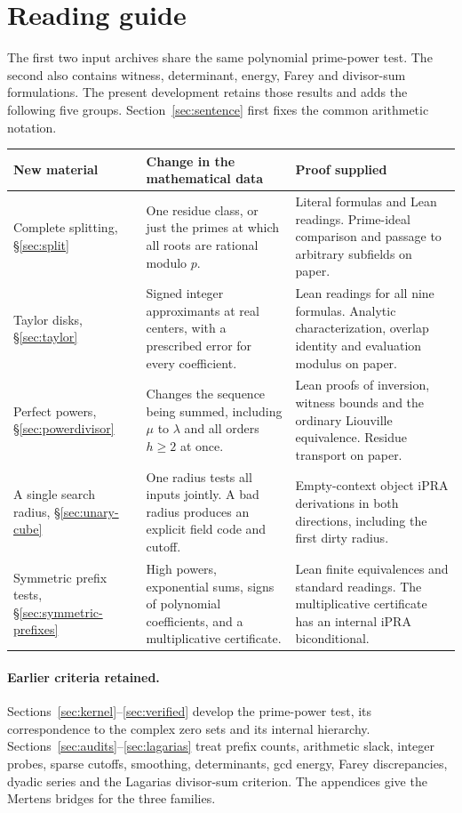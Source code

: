 \section*{Reading guide}
The first two input archives share the same polynomial prime-power test. The second also contains witness, determinant, energy, Farey and divisor-sum formulations. The present development retains those results and adds the following five groups. Section~\ref{sec:sentence} first fixes the common arithmetic notation.
\begin{center}\small
\begin{tabular}{@{}>{\raggedright\arraybackslash}p{.25\linewidth}>{\raggedright\arraybackslash}p{.32\linewidth}>{\raggedright\arraybackslash}p{.35\linewidth}@{}}\toprule
New material & Change in the mathematical data & Proof supplied\\\midrule
Complete splitting, \S\ref{sec:split} & One residue class, or just the primes at which all roots are rational modulo $p$. & Literal formulas and Lean readings. Prime-ideal comparison and passage to arbitrary subfields on paper.\\[4pt]
Taylor disks, \S\ref{sec:taylor} & Signed integer approximants at real centers, with a prescribed error for every coefficient. & Lean readings for all nine formulas. Analytic characterization, overlap identity and evaluation modulus on paper.\\[4pt]
Perfect powers, \S\ref{sec:powerdivisor} & Changes the sequence being summed, including $\mu$ to $\lambda$ and all orders $h\ge2$ at once. & Lean proofs of inversion, witness bounds and the ordinary Liouville equivalence. Residue transport on paper.\\[4pt]
A single search radius, \S\ref{sec:unary-cube} & One radius tests all inputs jointly. A bad radius produces an explicit field code and cutoff. & Empty-context object iPRA derivations in both directions, including the first dirty radius.\\[4pt]
Symmetric prefix tests, \S\ref{sec:symmetric-prefixes} & High powers, exponential sums, signs of polynomial coefficients, and a multiplicative certificate. & Lean finite equivalences and standard readings. The multiplicative certificate has an internal iPRA biconditional.\\\bottomrule
\end{tabular}
\end{center}
\paragraph{Earlier criteria retained.}
Sections~\ref{sec:kernel}--\ref{sec:verified} develop the prime-power test, its correspondence to the complex zero sets and its internal hierarchy. Sections~\ref{sec:audits}--\ref{sec:lagarias} treat prefix counts, arithmetic slack, integer probes, sparse cutoffs, smoothing, determinants, gcd energy, Farey discrepancies, dyadic series and the Lagarias divisor-sum criterion. The appendices give the Mertens bridges for the three families.
